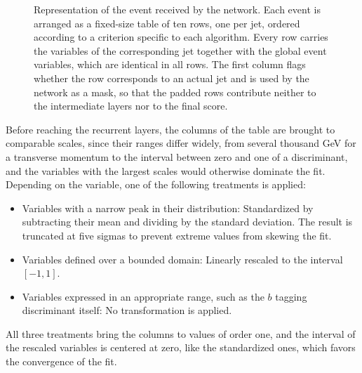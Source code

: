 \begin{figure}[t]
\caption{Representation of the event received by the network. Each event is arranged as a
fixed-size table of ten rows, one per jet, ordered according to a criterion specific to each
algorithm. Every row carries the variables of the corresponding jet together with the global event variables, which are identical in all rows. The first column flags whether the row
corresponds to an actual jet and is used by the network as a mask, so that the padded rows contribute neither to the intermediate layers nor to the final score.}
\label{fig:input_tensor}
\end{figure}
%

Before reaching the recurrent layers, the columns of the table are brought to comparable scales, since their ranges differ widely, from several thousand GeV for a transverse momentum to the interval between zero and one of a discriminant, and the variables with the largest scales would otherwise dominate the fit. Depending on the variable, one of the following treatments is applied:
\begin{itemize}
    \item Variables with a narrow peak in their distribution: Standardized by subtracting their mean and dividing by the standard deviation. The result is truncated at five sigmas to prevent extreme values from skewing the fit.
    \item Variables defined over a bounded domain: Linearly rescaled to the interval $[-1,1]$.
    \item Variables expressed in an appropriate range, such as the $b$ tagging discriminant itself: No transformation is applied.
\end{itemize}
All three treatments bring the columns to values of order one, and the interval of the rescaled variables is centered at zero, like the standardized ones, which favors the convergence of the fit.


